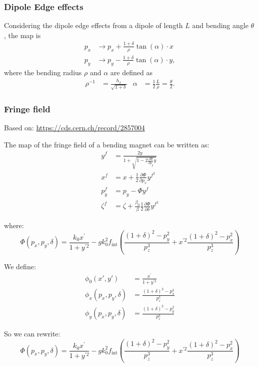 \subsubsection{Dipole Edge effects}
Considering the dipole edge effects from a dipole of length $L$ and bending angle $\theta$, 
the map is
\begin{align*}
    p_x &\to p_x + \frac{1+\delta}{\rho} \tan(\alpha) \cdot x \\
    p_y &\to p_y - \frac{1+\delta}{\rho} \tan(\alpha) \cdot y,
\end{align*}
where the bending radius $\rho$ and $\alpha$ are defined as
\begin{align*}
    \rho^{-1}   &= \frac{h_x}{\sqrt{1+\delta}} &
    \alpha &= \frac{1}{2} \frac{L}{\rho} = \frac{\theta}{2}.
\end{align*}

\subsubsection{Fringe field}

Based on: \url{https://cds.cern.ch/record/2857004}

The map of the fringe field of a bending magnet can be written as:
\begin{align} 
y^f & =\frac{2 y}{1+\sqrt{1-2 \frac{\partial \Phi}{\partial p_y} y}} \\ 
x^f & =x+\frac{1}{2} \frac{\partial \Phi}{\partial p_x} y^{f^2} \\
p_y^f & =p_y-\Phi y^f \\ 
\zeta^f & =\zeta+\frac{\beta_0}{\beta}\frac{1}{2} \frac{\partial \Phi}{\partial \delta} y^{f^2}
\end{align}


where:
\begin{equation}
\Phi\left(p_x, p_y, \delta\right)=\frac{k_0 x^{\prime}}{1+y^{\prime 2}}
-g k_0^2 f_\text{int}
\left(\frac{(1+\delta)^2-p_y^2}{p_z^3}
+x^{\prime 2}
\frac{(1+\delta)^2-p_x^2}{p_z^3}\right)
\end{equation}

We define:
\begin{align}
\phi_0(x', y') &= \frac{x^{\prime}}{1+y^{\prime 2}}\\
\phi_x(p_x, p_y, \delta) &= \frac{(1+\delta)^2-p_x^2}{p_z^3}\\
\phi_y(p_x, p_y, \delta) &= \frac{(1+\delta)^2-p_y^2}{p_z^3}
\end{align}

So we can rewrite:
\begin{equation}
\Phi\left(p_x, p_y, \delta\right)=\frac{k_0 x^{\prime}}{1+y^{\prime 2}}
-g k_0^2 f_\text{int}
\left(\frac{(1+\delta)^2-p_y^2}{p_z^3}
+x^{\prime 2}
\frac{(1+\delta)^2-p_x^2}{p_z^3}\right)
\end{equation}

